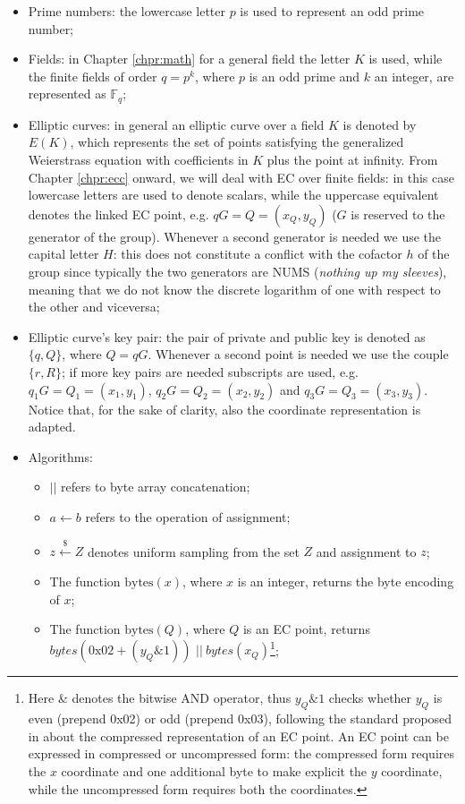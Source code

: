 \begin{itemize}
\item Prime numbers: the lowercase letter $p$ is used to represent an odd prime number;
\item Fields: in Chapter \ref{chpr:math} for a general field the letter $K$ is used, while the finite fields of order $q = p^k$, where $p$ is an odd prime and $k$ an integer, are represented as $\mathbb{F}_q$;
\item Elliptic curves: in general an elliptic curve over a field $K$ is denoted by $E(K)$, which represents the set of points satisfying the generalized Weierstrass equation with coefficients in $K$ plus the point at infinity. From Chapter \ref{chpr:ecc} onward, we will deal with EC over finite fields: in this case lowercase letters are used to denote scalars, while the uppercase equivalent denotes the linked EC point, e.g. $qG = Q = (x_Q, y_Q)$ ($G$ is reserved to the generator of the group). Whenever a second generator is needed we use the capital letter $H$: this does not constitute a conflict with the cofactor $h$ of the group since typically the two generators are NUMS (\textit{nothing up my sleeves}), meaning that we do not know the discrete logarithm of one with respect to the other and viceversa;
\item Elliptic curve's key pair: the pair of private and public key is denoted as $\{q, Q\}$, where $Q = qG$. Whenever a second point is needed we use the couple $\{r, R\}$; if more key pairs are needed subscripts are used, e.g. $q_1G = Q_1 = (x_1, y_1)$, $q_2G = Q_2 = (x_2, y_2)$ and $q_3G = Q_3 = (x_3, y_3)$. Notice that, for the sake of clarity, also the coordinate representation is adapted.
\item Algorithms:
    \begin{itemize}
		\item $||$ refers to byte array concatenation;
		\item $a \gets b$ refers to the operation of assignment;
		\item $z \xleftarrow{\text{\$}} Z$ denotes uniform sampling from the set $Z$ and assignment to $z$;
		\item The function $\text{bytes}(x)$, where $x$ is an integer, returns the byte encoding of $x$;
		\item The function $\text{bytes}(Q)$, where $Q$ is an EC point, returns $bytes(0\text{x}02 + (y_Q \& 1))$ $ || \ bytes(x_Q)$\footnote{Here \& denotes the bitwise AND operator, thus $y_Q \& 1$ checks whether $y_Q$ is even (prepend 0x02) or odd (prepend 0x03), following the standard proposed in \cite{RefWork:2} about the compressed representation of an EC point. An EC point can be expressed in compressed or uncompressed form: the compressed form requires the $x$ coordinate and one additional byte to make explicit the $y$ coordinate, while the uncompressed form requires both the coordinates.};

\end{itemize}
\end{itemize}
